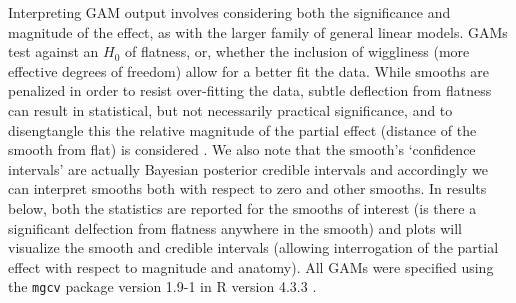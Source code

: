 \documentclass[12pt]{article}
\begin{document}
Interpreting GAM output involves considering both the significance and magnitude of the effect, as with the larger family of general linear models. GAMs test against an $H_0$ of flatness, or, whether the inclusion of wiggliness (more effective degrees of freedom) allow for a better fit the data. While smooths are penalized in order to resist over-fitting the data, subtle deflection from flatness can result in statistical, but not necessarily practical significance, and to disengtangle this the relative magnitude of the partial effect (distance of the smooth from flat) is considered \parencite{baayen2020IntroductionGeneralizedAdditive}. We also note that the smooth's `confidence intervals' are actually Bayesian posterior credible intervals \parencite{pedersen2019HierarchicalGeneralizedAdditive} and accordingly we can interpret smooths both with respect to zero and other smooths. In results below, both the statistics are reported for the smooths of interest (is there a significant delfection from flatness anywhere in the smooth) and plots will visualize the smooth and credible intervals (allowing interrogation of the partial effect with respect to magnitude and anatomy). All GAMs were specified using the \lstinline{mgcv} package version 1.9-1 \parencite{wood2017GeneralizedAdditiveModels} in R version 4.3.3 \parencite{rcoreteam2023LanguageEnvironmentStatistical}.
\end{document}
